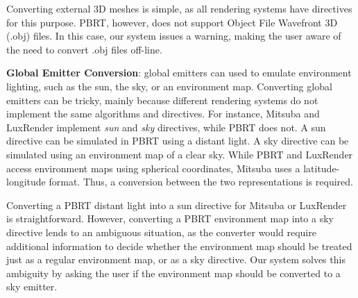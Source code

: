 Converting external 3D meshes is simple, as all rendering systems have directives
for this purpose. PBRT, however, does not support Object File Wavefront 3D
(.obj) files. 
In this case, our system issues a warning, making the user aware of the need to convert .obj files off-line.


\textbf{Global Emitter Conversion}:
global emitters can used to emulate environment lighting, such as the sun, the
sky, or an environment map. Converting global emitters can be tricky, mainly
because different rendering systems do not implement the same algorithms and directives. 
For instance, Mitsuba and LuxRender implement {\it sun} and {\it sky} directives, while PBRT does not.
A sun directive can be simulated in PBRT using a distant light. A sky directive can
be simulated using an environment map of a clear sky.
While PBRT and LuxRender access environment maps using spherical coordinates, 
Mitsuba uses a latitude-longitude format. Thus, a conversion between the two representations is required. 
  
%
Converting a PBRT distant light into
a sun directive for Mitsuba or LuxRender is straightforward. However, converting a PBRT
environment map into a sky directive lends to an ambiguous situation, as the converter would require additional information to decide 
whether the environment map should be treated just as a regular environment map, or as a sky directive.
Our system solves this ambiguity by asking the user if the environment map should be converted to a sky
emitter.





